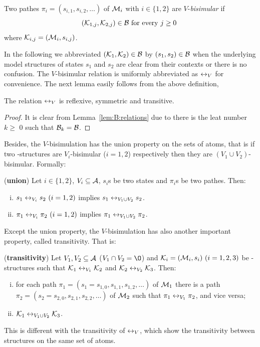 \documentclass{article}
\begin{document}
 Two pathes $\pi_i=(s_{i,1},s_{i,2},\ldots)$ of ${\cal M}_i$ with $i\in \{1,2\}$
 are $V$-{\em bisimular} if
 \[({\cal K}_{1,j},{\cal K}_{2,j})\in {\cal B} \mbox { for every $j\ge 0$ }\]
 where ${\cal K}_{i,j}=({\cal M}_i,s_{i,j})$.

 In the following we abbreviated $({\cal K}_1,{\cal K}_2)\in \cal B$
 by $(s_1,s_2)\in \cal B$
 when the underlying model structures of states $s_1$ and $s_2$ are clear from their contexts
 or there is no confusion.
  The $V$-bisimular relation is uniformly abbreviated as $\leftrightarrow_V$ for convenience.%
  The next lemma easily follows from the above definition,
\begin{lemma}
  The relation $\leftrightarrow_V$ is reflexive, symmetric and transitive.
\end{lemma}
\begin{proof}
It is clear from Lemma~\ref{lem:B:relations} due to there is the leat number $k \geq $ 0 such that ${\cal B}_k = {\cal B}$.
\end{proof}

Besides, the $V$-bisimulation has the union property on the sets of atoms, that is if two \MPK-structures are $V_i$-bisimular ($i=1,2$) respectively then they are $(V_1 \cup V_2)$-bisimular. Formally:
\begin{proposition}\label{Pro:div}
(\textbf{union})
  Let $i\in \{1,2\}$, $V_i\subseteq{\cal A}$, $s_i$s be two states and
  $\pi_i$s be two pathes. Then:
  \begin{enumerate}[(i)]
    \item $s_1\leftrightarrow_{V_i}s_2~(i=1,2)$ implies $s_1\leftrightarrow_{V_1\cup V_2}s_2$.
    \item $\pi_1\leftrightarrow_{V_i}\pi_2~(i=1,2)$ implies $\pi_1\leftrightarrow_{V_1\cup V_2}\pi_2$.
  \end{enumerate}
\end{proposition}

Except the union property, the $V$-bisimulation has also another important property, called transitivity. That is:
\begin{proposition}\label{div}
(\textbf{transitivity})
Let $V_1,V_2\subseteq\cal A$ ($V_1 \cap V_2 = {\O}$) and ${\cal K}_i=({\cal M}_i,s_i)~(i=1,2,3)$ be \MPK-structures
 such that
${\cal K}_1\leftrightarrow_{V_1}{\cal K}_2$ and ${\cal K}_2\leftrightarrow_{V_2}{\cal K}_3$.
 Then:
 \begin{enumerate}[(i)]
   \item for each path $\pi_1=(s_1=s_{1,0}, s_{1,1}, s_{1,2},\dots)$ of ${\cal M}_1$ there is a path $\pi_2=(s_2=s_{2,0}, s_{2,1}, s_{2,2}, \dots)$  of ${\cal M}_2$ such that $\pi_1 \leftrightarrow_{V_1} \pi_2$, and vice versa;
   \item ${\cal K}_1\leftrightarrow_{V_1\cup V_2}{\cal K}_3$.
 \end{enumerate}
\end{proposition}
This is different with the transitivity of $\leftrightarrow_V$, which show the transitivity between structures on the same set of atoms.
\end{document}
